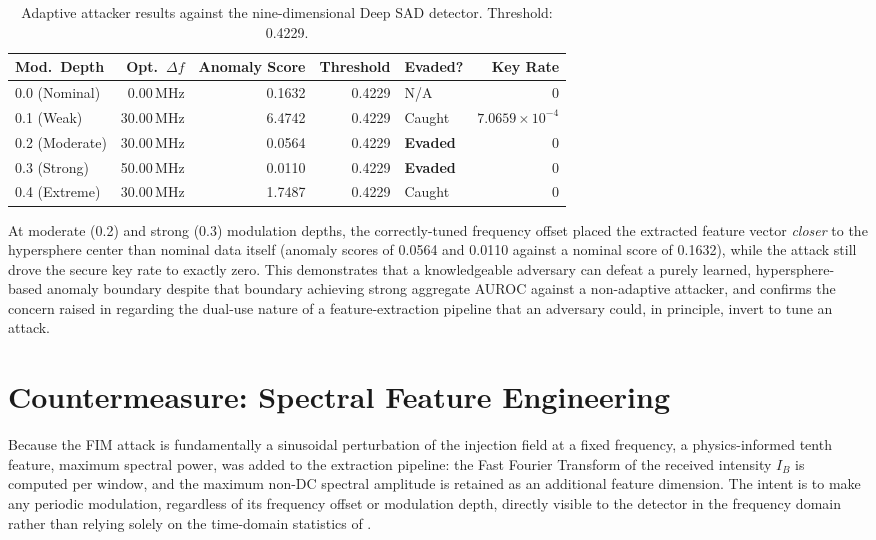 \documentclass[12pt, a4paper]{report}
\begin{document}
\begin{table}[H]
\centering
\caption{Adaptive attacker results against the nine-dimensional Deep SAD detector. Threshold: 0.4229.}
\label{tab:adaptive_initial}
\begin{tabular}{@{}lrrrlr@{}}
\toprule
\textbf{Mod.\ Depth} & \textbf{Opt.\ $\Delta f$} & \textbf{Anomaly Score} & \textbf{Threshold} & \textbf{Evaded?} & \textbf{Key Rate} \\
\midrule
0.0 (Nominal) & 0.00\,MHz  & 0.1632 & 0.4229 & N/A       & 0 \\
0.1 (Weak)    & 30.00\,MHz & 6.4742 & 0.4229 & Caught    & $7.0659\times10^{-4}$ \\
0.2 (Moderate)& 30.00\,MHz & 0.0564 & 0.4229 & \textbf{Evaded} & 0 \\
0.3 (Strong)  & 50.00\,MHz & 0.0110 & 0.4229 & \textbf{Evaded} & 0 \\
0.4 (Extreme) & 30.00\,MHz & 1.7487 & 0.4229 & Caught    & 0 \\
\bottomrule
\end{tabular}
\end{table}

At moderate (0.2) and strong (0.3) modulation depths, the correctly-tuned frequency offset placed the extracted feature vector \emph{closer} to the hypersphere center than nominal data itself (anomaly scores of 0.0564 and 0.0110 against a nominal score of 0.1632), while the attack still drove the secure key rate to exactly zero. This demonstrates that a knowledgeable adversary can defeat a purely learned, hypersphere-based anomaly boundary despite that boundary achieving strong aggregate AUROC against a non-adaptive attacker, and confirms the concern raised in  regarding the dual-use nature of a feature-extraction pipeline that an adversary could, in principle, invert to tune an attack.

\section{Countermeasure: Spectral Feature Engineering}\label{sec:adaptive_fix}
Because the FIM attack is fundamentally a sinusoidal perturbation of the injection field at a fixed frequency, a physics-informed tenth feature, maximum spectral power, was added to the extraction pipeline: the Fast Fourier Transform of the received intensity $I_B$ is computed per window, and the maximum non-DC spectral amplitude is retained as an additional feature dimension. The intent is to make any periodic modulation, regardless of its frequency offset or modulation depth, directly visible to the detector in the frequency domain rather than relying solely on the time-domain statistics of .
\end{document}
